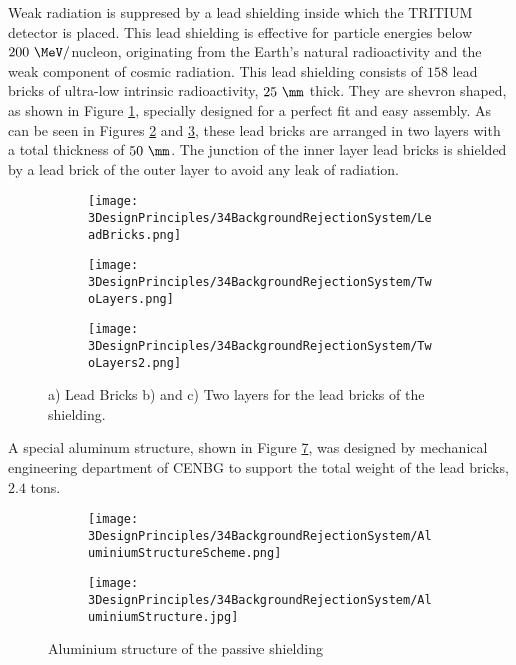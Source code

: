Weak radiation is suppresed by a lead shielding inside which the TRITIUM detector is placed. This lead shielding is effective for particle energies below $200~\MeV/$nucleon, originating from the Earth's natural radioactivity and the weak component of cosmic radiation. This lead shielding consists of $158$ lead bricks of ultra-low intrinsic radioactivity, $25~\mm$ thick. They are shevron shaped, as shown in Figure \ref{subfig:LeadBricks}, specially designed for a perfect fit and easy assembly. As can be seen in Figures \ref{subfig:TwoLayers} and \ref{subfig:TwoLayers2}, these lead bricks are arranged in two layers with a total thickness of $50~\mm$. The junction of the inner layer lead bricks is shielded by a lead brick of the outer layer to avoid any leak of radiation.

\begin{figure}[h]
\centering
    \begin{subfigure}[b]{0.3\textwidth}
    \centering
    \texttt{[image: 3DesignPrinciples/34BackgroundRejectionSystem/LeadBricks.png]}  
    \caption{\label{subfig:LeadBricks}}
    \end{subfigure}
    \hfill
    \begin{subfigure}[b]{0.3\textwidth}
    \centering
    \texttt{[image: 3DesignPrinciples/34BackgroundRejectionSystem/TwoLayers.png]}  
    \caption{\label{subfig:TwoLayers}}
    \end{subfigure}
    \hfill
    \begin{subfigure}[b]{0.3\textwidth}
    \centering
    \texttt{[image: 3DesignPrinciples/34BackgroundRejectionSystem/TwoLayers2.png]}  
    \caption{\label{subfig:TwoLayers2}}
    \end{subfigure}
 \caption{a) Lead Bricks b) and c) Two layers for the lead bricks of the shielding.}
 \label{fig:LeadBricksAndArrangement}
\end{figure}

A special aluminum structure, shown in Figure \ref{fig:AluminiumStructure}, was designed by mechanical engineering department of CENBG to support the total weight of the lead bricks, $2.4$ tons.

\begin{figure}
\centering
    \begin{subfigure}[b]{0.45\textwidth}
    \centering
    \texttt{[image: 3DesignPrinciples/34BackgroundRejectionSystem/AluminiumStructureScheme.png]}  
    \caption{\label{subfig:AluminiumStructureScheme}}
    \end{subfigure}
    \hfill
    \begin{subfigure}[b]{0.4\textwidth}
    \centering
    \texttt{[image: 3DesignPrinciples/34BackgroundRejectionSystem/AluminiumStructure.jpg]}  
    \caption{\label{subfig:AluminiumStructure}}
    \end{subfigure}
    \caption{Aluminium structure of the passive shielding}
 \label{fig:AluminiumStructure}
\end{figure}

